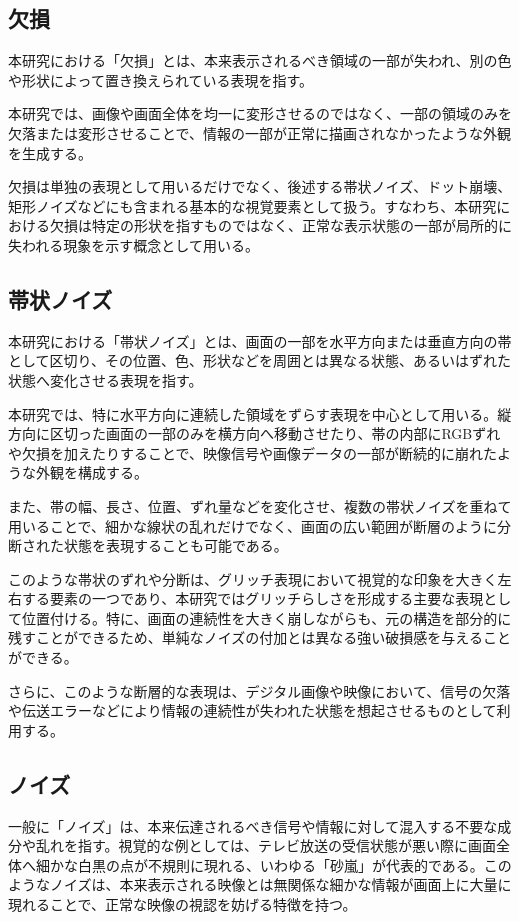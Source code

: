 \subsection{欠損}

本研究における「欠損」とは、本来表示されるべき領域の一部が失われ、別の色や形状によって置き換えられている表現を指す。

本研究では、画像や画面全体を均一に変形させるのではなく、一部の領域のみを欠落または変形させることで、情報の一部が正常に描画されなかったような外観を生成する。

欠損は単独の表現として用いるだけでなく、後述する帯状ノイズ、ドット崩壊、矩形ノイズなどにも含まれる基本的な視覚要素として扱う。すなわち、本研究における欠損は特定の形状を指すものではなく、正常な表示状態の一部が局所的に失われる現象を示す概念として用いる。


\subsection{帯状ノイズ}

本研究における「帯状ノイズ」とは、画面の一部を水平方向または垂直方向の帯として区切り、その位置、色、形状などを周囲とは異なる状態、あるいはずれた状態へ変化させる表現を指す。

本研究では、特に水平方向に連続した領域をずらす表現を中心として用いる。縦方向に区切った画面の一部のみを横方向へ移動させたり、帯の内部にRGBずれや欠損を加えたりすることで、映像信号や画像データの一部が断続的に崩れたような外観を構成する。

また、帯の幅、長さ、位置、ずれ量などを変化させ、複数の帯状ノイズを重ねて用いることで、細かな線状の乱れだけでなく、画面の広い範囲が断層のように分断された状態を表現することも可能である。

このような帯状のずれや分断は、グリッチ表現において視覚的な印象を大きく左右する要素の一つであり、本研究ではグリッチらしさを形成する主要な表現として位置付ける。特に、画面の連続性を大きく崩しながらも、元の構造を部分的に残すことができるため、単純なノイズの付加とは異なる強い破損感を与えることができる。

さらに、このような断層的な表現は、デジタル画像や映像において、信号の欠落や伝送エラーなどにより情報の連続性が失われた状態を想起させるものとして利用する。


\subsection{ノイズ}

一般に「ノイズ」は、本来伝達されるべき信号や情報に対して混入する不要な成分や乱れを指す。視覚的な例としては、テレビ放送の受信状態が悪い際に画面全体へ細かな白黒の点が不規則に現れる、いわゆる「砂嵐」が代表的である。このようなノイズは、本来表示される映像とは無関係な細かな情報が画面上に大量に現れることで、正常な映像の視認を妨げる特徴を持つ。

